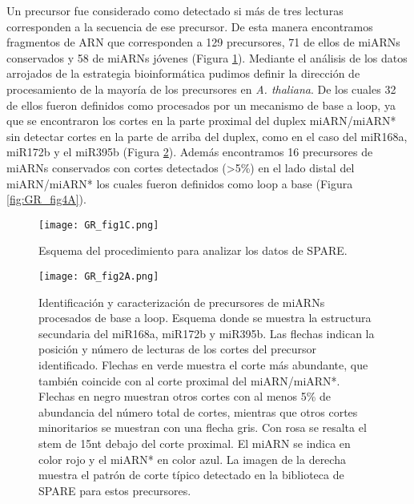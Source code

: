Un precursor fue considerado como detectado si más de tres lecturas corresponden a la secuencia de ese precursor.
De esta manera encontramos fragmentos de ARN que corresponden a 129 precursores, 71 de ellos de miARNs conservados y 58 de miARNs jóvenes (Figura \ref{fig:GR_fig1C}).
Mediante el análisis de los datos arrojados de la estrategia bioinformática pudimos definir la dirección de procesamiento de la mayoría de los precursores en \textit{A. thaliana}.
De los cuales 32 de ellos fueron definidos como procesados por un mecanismo de base a loop, ya que se encontraron los cortes en la parte proximal del duplex miARN/miARN* sin detectar cortes en la parte de arriba del duplex, como en el caso del miR168a, miR172b y el miR395b (Figura \ref{fig:GR_fig2A}).
Además encontramos 16 precursores de miARNs conservados con cortes detectados (>5\%) en el lado distal del miARN/miARN* los cuales fueron definidos como loop a base (Figura \ref{fig:GR_fig4A}).

\begin{figure}[htbp!] 
    \centering    
    \texttt{[image: GR\_fig1C.png]}
    \caption[Esquema del procedimiento para analizar los datos de SPARE]{Esquema del procedimiento para analizar los datos de SPARE.}
    \label{fig:GR_fig1C}
\end{figure}

\begin{figure}[htbp!] 
    \centering    
    \texttt{[image: GR\_fig2A.png]}
    \caption[Identificación y caracterización de precursores de miARNs procesados de base a loop]{Identificación y caracterización de precursores de miARNs procesados de base a loop.
            Esquema donde se muestra la estructura secundaria del miR168a, miR172b y miR395b.
            Las flechas indican la posición y número de lecturas de los cortes del precursor identificado.
            Flechas en verde muestra el corte más abundante, que también coincide con al corte proximal del miARN/miARN*.
            Flechas en negro muestran otros cortes con al menos 5\% de abundancia del número total de cortes, mientras que otros cortes minoritarios se muestran con una flecha gris.
            Con rosa se resalta el stem de 15nt debajo del corte proximal.
            El miARN se indica en color rojo y el miARN* en color azul.
            La imagen de la derecha muestra el patrón de corte típico detectado en la biblioteca de SPARE para estos precursores.}
    \label{fig:GR_fig2A}
\end{figure}

